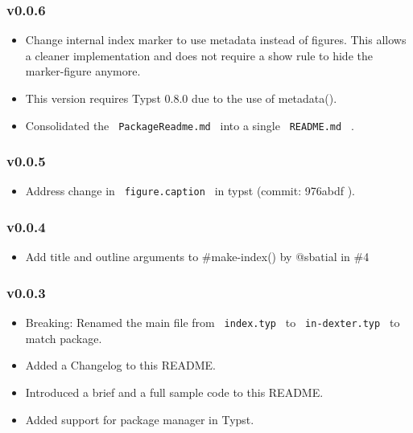\subsubsection{v0.0.6}\label{v0.0.6}

\begin{itemize}
\tightlist
\item
  Change internal index marker to use metadata instead of figures. This
  allows a cleaner implementation and does not require a show rule to
  hide the marker-figure anymore.
\item
  This version requires Typst 0.8.0 due to the use of metadata().
\item
  Consolidated the \texttt{\ PackageReadme.md\ } into a single
  \texttt{\ README.md\ } .
\end{itemize}

\subsubsection{v0.0.5}\label{v0.0.5}

\begin{itemize}
\tightlist
\item
  Address change in \texttt{\ figure.caption\ } in typst (commit:
  976abdf ).
\end{itemize}

\subsubsection{v0.0.4}\label{v0.0.4}

\begin{itemize}
\tightlist
\item
  Add title and outline arguments to \#make-index() by @sbatial in \#4
\end{itemize}

\subsubsection{v0.0.3}\label{v0.0.3}

\begin{itemize}
\tightlist
\item
  Breaking: Renamed the main file from \texttt{\ index.typ\ } to
  \texttt{\ in-dexter.typ\ } to match package.
\item
  Added a Changelog to this README.
\item
  Introduced a brief and a full sample code to this README.
\item
  Added support for package manager in Typst.
\end{itemize}

